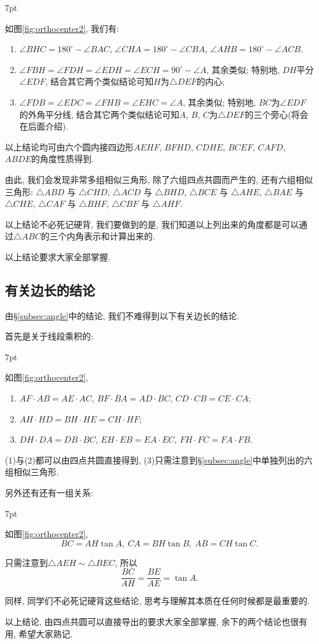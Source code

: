 \documentclass{book}
\newenvironment{theorem}{%
\def\FrameCommand{%
\hspace{1pt}%
{\color{cyan!60!blue}\vrule width 2pt}%
{\color{cyan!10}\vrule width 4pt}%
\colorbox{cyan!10}%
}%
\MakeFramed{\advance\hsize-\width\FrameRestore}%
\noindent\hspace{-4.55pt}%
\begin{adjustwidth}{}{7pt}%
\vspace{2pt}\vspace{2pt}%
}
{%
\vspace{2pt}\end{adjustwidth}\endMakeFramed%
}
\begin{document}
\begin{paracol}{2}
\switchcolumn
\begin{theorem}
	\kaishu 如图\ref{fig:orthocenter2}, 我们有:
	\begin{enumerate}[(1)]
		\item $\angle BHC=180^\circ-\angle BAC$, $\angle CHA=180^\circ-\angle CBA$, $\angle AHB=180^\circ-\angle ACB$.
		\item $\angle FBH=\angle FDH=\angle EDH=\angle ECH=90^\circ-\angle A$, 其余类似; 特别地, $DH$平分$\angle EDF$, 结合其它两个类似结论可知$H$为$\triangle DEF$的内心;
		\item $\angle FDB=\angle EDC=\angle FHB=\angle EHC=\angle A$, 其余类似; 特别地, $BC$为$\angle EDF$的外角平分线, 结合其它两个类似结论可知$A$, $B$, $C$为$\triangle DEF$的三个旁心(将会在后面介绍).
	\end{enumerate}
\end{theorem}
以上结论均可由六个圆内接四边形$AEHF$, $BFHD$, $CDHE$, $BCEF$, $CAFD$, $ABDE$的角度性质得到.\par
由此, 我们会发现非常多组相似三角形, 除了六组四点共圆而产生的, 还有六组相似三角形: $\triangle ABD$ 与 $\triangle CHD$, $\triangle ACD$ 与 $\triangle BHD$, $\triangle BCE$ 与 $\triangle AHE$, $\triangle BAE$ 与 $\triangle CHE$, $\triangle CAF$ 与 $\triangle BHF$, $\triangle CBF$ 与 $\triangle AHF$.\par
以上结论不必死记硬背, 我们要做到的是, 我们知道以上列出来的角度都是可以通过$\triangle ABC$的三个内角表示和计算出来的.\par
以上结论要求大家全部掌握.

\subsection{有关边长的结论}
由\S\ref{subsec:angle}中的结论, 我们不难得到以下有关边长的结论.\par
首先是关于线段乘积的:
\begin{theorem}
\kaishu 如图\ref{fig:orthocenter2}, 
\begin{enumerate}[(1)]
	\item $AF\cdot AB=AE\cdot AC$, $BF\cdot BA=AD\cdot BC$, $CD\cdot CB=CE\cdot CA$;
	\item $AH\cdot HD=BH\cdot HE=CH\cdot HF$;
	\item $DH\cdot DA=DB\cdot BC$, $EH\cdot EB=EA\cdot EC$, $FH\cdot FC=FA\cdot FB$.
\end{enumerate}
\end{theorem}\par
(1)与(2)都可以由四点共圆直接得到, (3)只需注意到\S\ref{subsec:angle}中单独列出的六组相似三角形.\par
另外还有还有一组关系:
\begin{theorem}
\kaishu 如图\ref{fig:orthocenter2}, 
\[BC=AH\tan{A},\ CA=BH\tan{B},\ AB=CH\tan{C}.\]
\end{theorem}\par
只需注意到$\triangle AEH\sim\triangle BEC$, 所以
\[\frac{BC}{AH}=\frac{BE}{AE}=\tan{A}.\]\par
同样, 同学们不必死记硬背这些结论, 思考与理解其本质在任何时候都是最重要的.\par
以上结论, 由四点共圆可以直接导出的要求大家全部掌握, 余下的两个结论也很有用, 希望大家熟记.


\end{paracol}
\end{document}

